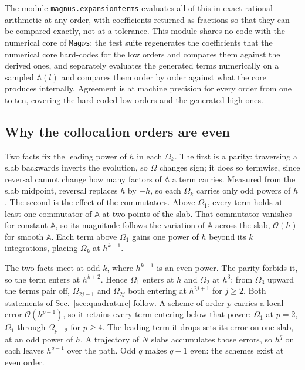 \documentclass[final,5p,times,twocolumn,sort,compress]{elsarticle}
\makeatletter
\DeclareRobustCommand{\_}{%
  \ifmmode\nfss@text{\textunderscore}\else\textunderscore\allowbreak\fi}
\newcommand{\magnus}{{\tt Mag}\ensuremath{\nu}{\tt s}}
\makeatother
\begin{document}
The module {\tt magnus.expansionterms} evaluates all of this in exact rational arithmetic at any order, with coefficients returned as fractions so that they can be compared exactly, not at a tolerance. This module shares no code with the numerical core of \magnus: the test suite regenerates the coefficients that the numerical core hard-codes for the low orders and compares them against the derived ones, and separately evaluates the generated terms numerically on a sampled $\mathbb{A}(l)$ and compares them order by order against what the core produces internally. Agreement is at machine precision for every order from one to ten, covering the hard-coded low orders and the generated high ones.

\subsection{Why the collocation orders are even}

Two facts fix the leading power of $h$ in each $\Omega_k$. The first is a parity: traversing a slab backwards inverts the evolution, so $\Omega$ changes sign; it does so termwise, since reversal cannot change how many factors of $\mathbb{A}$ a term carries. Measured from the slab midpoint, reversal replaces $h$ by $-h$, so each $\Omega_k$ carries only odd powers of $h$. The second is the effect of the commutators. Above $\Omega_1$, every term holds at least one commutator of $\mathbb{A}$ at two points of the slab. That commutator vanishes for constant $\mathbb{A}$, so its magnitude follows the variation of $\mathbb{A}$ across the slab, $\mathcal{O}(h)$ for smooth $\mathbb{A}$. Each term above $\Omega_1$ gains one power of $h$ beyond its $k$ integrations, placing $\Omega_k$ at $h^{k+1}$.

The two facts meet at odd $k$, where $h^{k+1}$ is an even power. The parity forbids it, so the term enters at $h^{k+2}$. Hence $\Omega_1$ enters at $h$ and $\Omega_2$ at $h^3$; from $\Omega_3$ upward the terms pair off, $\Omega_{2j-1}$ and $\Omega_{2j}$ both entering at $h^{2j+1}$ for $j \geq 2$. Both statements of Sec.~\ref{sec:quadrature} follow. A scheme of order $p$ carries a local error $\mathcal{O}(h^{p+1})$, so it retains every term entering below that power: $\Omega_1$ at $p = 2$, $\Omega_1$ through $\Omega_{p-2}$ for $p \geq 4$. The leading term it drops sets its error on one slab, at an odd power of $h$. A trajectory of $N$ slabs accumulates those errors, so $h^q$ on each leaves $h^{q-1}$ over the path. Odd $q$ makes $q-1$ even: the schemes exist at even order.
\end{document}
